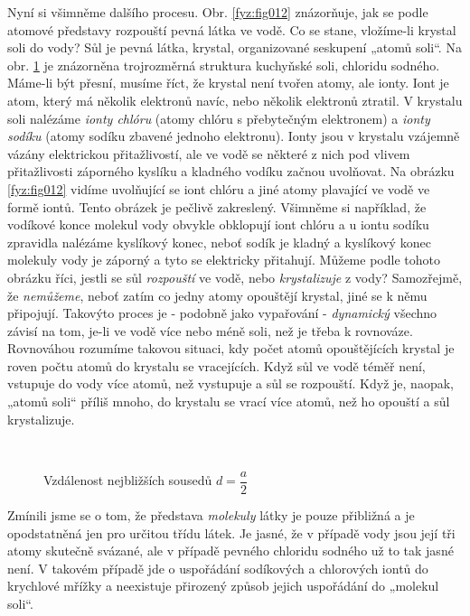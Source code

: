     Nyní si všimněme dalšího procesu. Obr. \ref{fyz:fig012} znázorňuje, jak se podle atomové
    představy rozpouští pevná látka ve vodě. Co se stane, vložíme-li krystal soli do vody? Sůl je
    pevná látka, krystal, organizované seskupení „atomů soli“. Na obr. \ref{fyz:fig013} je
    znázorněna trojrozměrná struktura kuchyňské soli, chloridu sodného. Máme-li být přesní, musíme
    říct, že krystal není tvořen atomy, ale ionty. Iont je atom, který má několik elektronů navíc,
    nebo několik elektronů ztratil. V krystalu soli nalézáme \emph{ionty chlóru} (atomy chlóru s
    přebytečným elektronem) a \emph{ionty sodíku} (atomy sodíku zbavené jednoho elektronu). Ionty
    jsou v krystalu vzájemně vázány elektrickou přitažlivostí, ale ve vodě se některé z nich pod
    vlivem přitažlivosti záporného kyslíku a kladného vodíku začnou uvolňovat. Na obrázku
    \ref{fyz:fig012} vidíme uvolňující se iont chlóru a jiné atomy plavající ve vodě ve formě iontů.
    Tento obrázek je pečlivě zakreslený. Všimněme si například, že vodíkové konce molekul vody
    obvykle obklopují iont chlóru a u iontu sodíku zpravidla nalézáme kyslíkový konec, neboť sodík
    je kladný a kyslíkový konec molekuly vody je záporný a tyto se elektricky přitahují. Můžeme
    podle tohoto obrázku říci, jestli se sůl \emph{rozpouští} ve vodě, nebo \emph{krystalizuje} z
    vody? Samozřejmě, že \emph{nemůžeme}, neboť zatím co jedny atomy opouštějí krystal, jiné se k
    němu připojují. Takovýto proces je - podobně jako vypařování - \emph{dynamický} všechno závisí
    na tom, je-li ve vodě více nebo méně soli, než je třeba k rovnováze. Rovnováhou rozumíme takovou
    situaci, kdy počet atomů opouštějících krystal je roven počtu atomů do krystalu se vracejících.
    Když sůl ve vodě téměř není, vstupuje do vody více atomů, než vystupuje a sůl se rozpouští. Když
    je, naopak, „atomů soli“ příliš mnoho, do krystalu se vrací více atomů, než ho opouští a sůl
    krystalizuje.

    \begin{figure}[hbt!]  %
      \centering
           \\                                   
      \caption{Vzdálenost nejbližších sousedů \(d = \dfrac{a}{2}\) \cite[s.~22]{Feynman01}}
      \label{fyz:fig013}
    \end{figure}
    
    Zmínili jsme se o tom, že představa \emph{molekuly} látky je pouze přibližná a je opodstatněná
    jen pro určitou třídu látek. Je jasné, že v případě vody jsou její tři atomy skutečně svázané,
    ale v případě pevného chloridu sodného už to tak jasné není. V takovém případě jde o uspořádání
    sodíkových a chlorových iontů do krychlové mřížky a neexistuje přirozený způsob jejich
    uspořádání do „molekul soli“.
    
